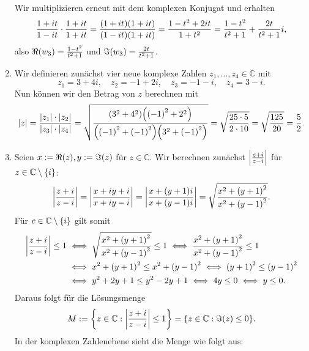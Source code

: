 \documentclass[german,12pt]{homework}
\newcommand{\CC}{\mathbb{C}}
\DeclarePairedDelimiter{\absolute}{\lvert}{\rvert}
\DeclarePairedDelimiter{\enbrace}{(}{)}
\DeclarePairedDelimiter{\penbrace}{\{}{\}}
\begin{document}
\begin{enumerate}
        Wir multiplizieren erneut mit dem komplexen Konjugat und erhalten
        \[\frac{1 + it}{1 - it} \cdot \frac{1 + it}{1 + it} = \frac{\enbrace*{1
        + it}\enbrace*{1 + it}}{\enbrace*{1 - it}\enbrace*{1 + it}} = \frac{1 -
        t^2 + 2it}{1 + t^2} = \frac{1 - t^2}{t^2 + 1} + \frac{2t}{t^2 + 1}i,\]
        also \(\Re\enbrace*{w_3} = \frac{1 - t^2}{t^2 + 1}\) und
        \(\Im\enbrace*{w_3} = \frac{2t}{t^2 + 1}\).
        \item Wir definieren zunächst vier neue komplexe Zahlen \(z_1, \ldots,
        z_4 \in \mathbb{C}\) mit
        \[z_1 = 3 + 4i, \quad z_2 = -1 + 2i, \quad z_3 = -1 - i, \quad z_4 = 3
        - i.\]
        Nun können wir den Betrag von \(z\) berechnen mit
        \[\absolute*{z} = \frac{\absolute*{z_1} \cdot
        \absolute*{z_2}}{\absolute*{z_3} \cdot \absolute*{z_4}} =
        \sqrt{\frac{\enbrace*{3^2 + 4^2}\enbrace*{\enbrace*{-1}^2 +
        2^2}}{\enbrace*{\enbrace*{-1}^2 + \enbrace*{-1}^2}\enbrace*{3^2 +
        \enbrace*{-1}^2}}} = \sqrt{\frac{25 \cdot 5}{2 \cdot 10}} =
        \sqrt{\frac{125}{20}} = \frac{5}{2}.\]
        \item Seien \(x := \Re\enbrace*{z}, y := \Im\enbrace*{z}\) für \(z \in
        \CC\). Wir berechnen zunächst \(\absolute*{\frac{z + i}{z - i}}\) für
        \(z \in \CC \setminus \penbrace*{i}\):
        \[\absolute*{\frac{z + i}{z - i}} = \absolute*{\frac{x + iy + i}{x + iy
        - i}} = \absolute*{\frac{x + \enbrace*{y + 1}i}{x + \enbrace*{y - 1}i}}
        = \sqrt{\frac{x^2 + \enbrace*{y + 1}^2}{x^2 + \enbrace*{y - 1}^2}}.\]
        Für \(c \in \CC \setminus \penbrace*{i}\) gilt somit
        \begin{align*}
            \absolute*{\frac{z + i}{z - i}} \le 1 &\iff \sqrt{\frac{x^2 +
            \enbrace*{y + 1}^2}{x^2 + \enbrace*{y - 1}^2}} \le 1 \iff \frac{x^2
            + \enbrace*{y + 1}^2}{x^2 + \enbrace*{y - 1}^2} \le 1\\
            &\iff x^2 + \enbrace*{y + 1}^2 \le x^2 + \enbrace*{y - 1}^2 \iff
            \enbrace*{y + 1}^2 \le \enbrace*{y - 1}^2\\
            &\iff y^2 + 2y + 1 \le y^2 - 2y + 1 \iff 4y \le 0 \iff y \le 0.
        \end{align*}
        Daraus folgt für die Lösungsmenge
        \[M := \penbrace*{z \in \CC : \absolute*{\frac{z + i}{z - i}} \le 1} =
        \penbrace*{z \in \CC : \Im\enbrace*{z} \le 0}.\]
        In der komplexen Zahlenebene sieht die Menge wie folgt aus:
        \begin{center}
\end{center}
\end{enumerate}
\end{document}
